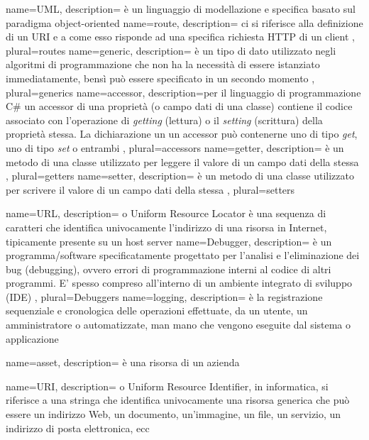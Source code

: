  {
	name=UML,
	description={ è un linguaggio di modellazione e specifica basato sul paradigma object-oriented
	}
}
 {
	name=route,
	description={ ci si riferisce alla definizione di un URI e a come esso risponde ad una specifica richiesta HTTP di un client
	},
	plural=routes
}
 {
	name=generic,
	description={ è un tipo di dato utilizzato negli algoritmi di programmazione che non ha la necessità di essere istanziato immediatamente, bensì può essere specificato in un secondo momento
	},
	plural=generics
}
 {
	name=accessor,
	description={per il linguaggio di programmazione C\# un accessor di una proprietà (o campo dati di una classe) contiene il codice associato con l'operazione di \textit{getting} (lettura) o il \textit{setting} (scrittura) della proprietà stessa. La dichiarazione un un accessor può contenerne uno di tipo \textit{get}, uno di tipo \textit{set} o entrambi
	},
	plural=accessors
}
 {
	name=getter,
	description={ è un metodo di una classe utilizzato per leggere il valore di un campo dati della stessa
	},
	plural=getters
}
 {
	name=setter,
	description={ è un metodo di una classe utilizzato per scrivere il valore di un campo dati della stessa
	},
	plural=setters
}

 {
	name=URL,
	description={ o Uniform Resource Locator è una sequenza di caratteri che identifica univocamente l'indirizzo di una risorsa in Internet, tipicamente presente su un host server
	}
}
 {
	name=Debugger,
	description={ è un programma/software specificatamente progettato per l'analisi e l'eliminazione dei bug (debugging), ovvero errori di programmazione interni al codice di altri programmi. E' spesso compreso all'interno di un ambiente integrato di sviluppo (IDE)
	},
	plural=Debuggers
}
 {
	name=logging,
	description={ è la registrazione sequenziale e cronologica delle operazioni effettuate, da un utente, un amministratore o automatizzate, man mano che vengono eseguite dal sistema o applicazione
	}
}

 {
	name=asset,
	description={ è una risorsa di un azienda
	}
}

 {
	name=URI,
	description={ o Uniform Resource Identifier, in informatica, si riferisce a una stringa che identifica univocamente una risorsa generica che può essere un indirizzo Web, un documento, un'immagine, un file, un servizio, un indirizzo di posta elettronica, ecc
	}
}







